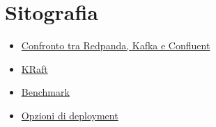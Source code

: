 \section{Sitografia}
\begin{itemize}
	\item \href{https://www.confluent.io/redpanda-vs-kafka-vs-confluent/}{Confronto tra Redpanda, Kafka e Confluent}
	\item \href{https://redpanda.com/blog/kafka-kraft-vs-redpanda-performance-2023}{KRaft}
	\item \href{https://redpanda.com/blog/is-redpanda-better-than-kafka-tco-comparison}{Benchmark}
	\item \href{https://www.kai-waehner.de/blog/2022/11/16/when-to-choose-redpanda-instead-of-apache-kafka/amp/}{Opzioni di deployment}
\end{itemize}







